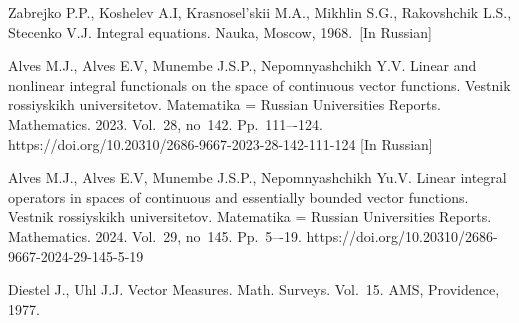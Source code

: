 \documentclass[12pt]{llncs}
\begin{document}
\begin{thebibliography}{9} 

 Zabrejko P.P., Koshelev A.I, Krasnosel'skii M.A., Mikhlin S.G., Rakovshchik L.S., Stecenko V.J. Integral equations. Nauka, Moscow, 1968.~[In Russian]

 Alves M.J., Alves E.V, Munembe J.S.P., Nepomnyashchikh Y.V. Linear and nonlinear integral functionals on the space of continuous vector functions. Vestnik rossiyskikh universitetov. Matematika = Russian Universities Reports. Mathematics. 2023. Vol.~28, no~142. Pp.~111–-124. https://doi.org/10.20310/2686-9667-2023-28-142-111-124 [In Russian]

 Alves M.J., Alves E.V, Munembe J.S.P., Nepomnyashchikh Yu.V. Linear integral operators in spaces of continuous and essentially bounded vector functions. Vestnik rossiyskikh universitetov. Matematika = Russian Universities Reports. Mathematics. 2024. Vol.~29, no~145. Pp.~5–-19. https://doi.org/10.20310/2686-9667-2024-29-145-5-19

 Diestel J., Uhl J.J. Vector Measures. Math. Surveys. Vol.~15. AMS, Providence, 1977. 

\end{thebibliography}
\end{document}
